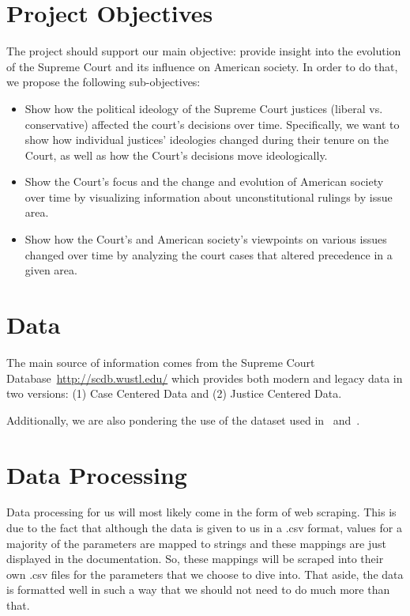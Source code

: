 \documentclass{article}
\begin{document}
\section{Project Objectives}
The project should support our main objective: provide insight into the evolution of the Supreme Court and its influence on American society. In order to do that, we propose the following sub-objectives:
\begin{itemize}
    \item Show how the political ideology of the Supreme Court justices (liberal vs. conservative) affected the court’s decisions over time. Specifically, we want to show how individual justices’ ideologies changed during their tenure on the Court, as well as how the Court's decisions move ideologically.
    \item Show the Court’s focus and the change and evolution of American society over time by visualizing information about unconstitutional rulings by issue area.
    \item Show how the Court’s and American society’s viewpoints on various issues changed over time by analyzing the court cases that altered precedence in a given area.
\end{itemize}

\section{Data}
The main source of information comes from the Supreme Court Database~\url{http://scdb.wustl.edu/} which provides both modern and legacy data in two versions: (1) Case Centered Data and (2) Justice Centered Data.

Additionally, we are also pondering the use of the dataset used in~\cite{fowler:2007} and~\cite{fowler:2008}.

\section{Data Processing}
Data processing for us will most likely come in the form of web scraping. This is due to the fact that although the data is given to us in a .csv format, values for a majority of the parameters are mapped to strings and these mappings are just displayed in the documentation. So, these mappings will be scraped into their own .csv files for the parameters that we choose to dive into. That aside, the data is formatted well in such a way that we should not need to do much more than that.
\end{document}
